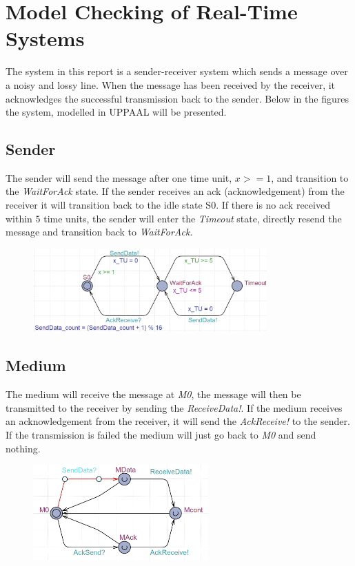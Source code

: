 \section*{Model Checking of Real-Time Systems} 
The system in this report is a sender-receiver system which sends a message over a noisy and lossy line. When the message has been received by the receiver, it acknowledges the successful transmission back to the sender. Below in the figures the system, modelled in UPPAAL will be presented. 

    \subsection*{Sender}
    The sender will send the message after one time unit, $x >= 1$,  and transition to the \textit{WaitForAck} state. If the sender receives an ack (acknowledgement) from the receiver it will transition back to the idle state S0. If there is no ack received within $5$ time units, the sender will enter the \textit{Timeout} state, directly resend the message and transition back to \textit{WaitForAck}.
    
    \begin{figure}[H]
        \centering
        \includegraphics[width=0.8\textwidth]{images/Sender.png}
        \caption{}
        \label{fig:sender}
    \end{figure}

    \subsection*{Medium}
    The medium will receive the message at \textit{M0}, the message will then be transmitted to the receiver by sending the \textit{ReceiveData!}. If the medium receives an acknowledgement from the receiver, it will send the \textit{AckReceive!} to the sender. If the transmission is failed the medium will just go back to \textit{M0} and send nothing.

    \begin{figure}[H]
        \centering
        \includegraphics[width=0.6\textwidth]{images/Medium.png}
        \caption{}
        \label{fig:medium}    
    \end{figure}

